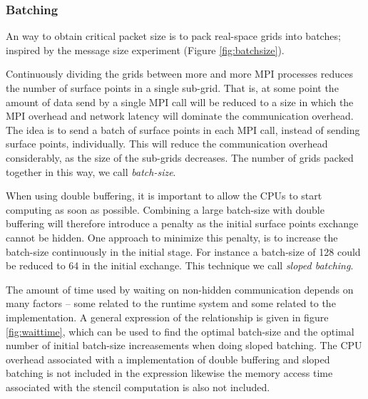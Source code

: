 \documentclass[preprint,3p,times,twocolumn]{elsarticle}
\begin{document}
\subsubsection{Batching}
An way to obtain critical packet size is to pack real-space grids into batches; inspired by the message size experiment (Figure \ref{fig:batchsize}).

Continuously dividing the grids between more and more MPI processes reduces the number of surface points in a single sub-grid. That is, at some point the amount of data send by a single MPI call will be reduced to a size in which the MPI overhead and network latency will dominate the communication overhead. The idea is to send a batch of surface points in each MPI call, instead of sending surface points, individually. This will reduce the communication overhead considerably, as the size of the sub-grids decreases. The number of grids packed together in this way, we call \emph{batch-size}.


When using double buffering, it is important to allow the CPUs to start computing as soon as possible. Combining a large batch-size with double buffering will therefore introduce a penalty as the initial surface points exchange cannot be hidden. One approach to minimize this penalty, is to increase the batch-size continuously in the initial stage. For instance a batch-size of 128 could be reduced to 64 in the initial exchange. This technique we call \emph{sloped batching}.

The amount of time used by waiting on non-hidden communication depends on many factors -- some related to the runtime system and some related to the implementation. A general expression of the relationship is given in figure \ref{fig:waittime}, which can be used to find the optimal batch-size and the optimal number of initial batch-size increasements when doing sloped batching. The CPU overhead associated with a implementation of double buffering and sloped batching is not included in the expression likewise the memory access time associated with the stencil computation is also not included.
\end{document}
